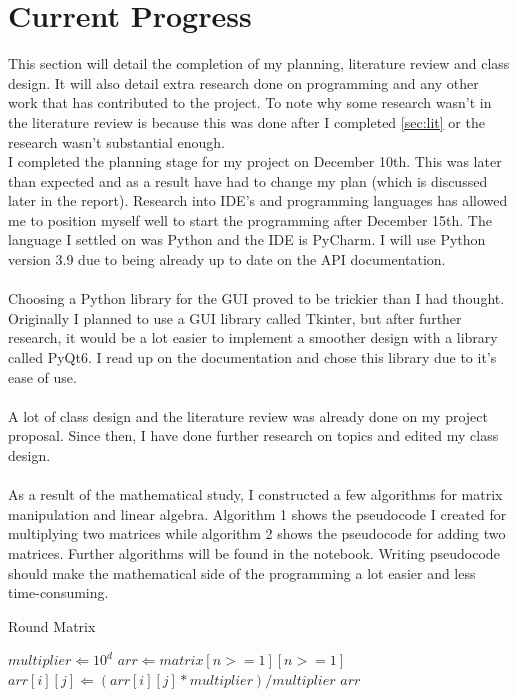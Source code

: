 \documentclass[final]{cmpreport}
\begin{document}
	\section{Current Progress}\label{sec:prog}
	This section will detail the completion of my planning, literature review and class design. It will also detail extra research done on programming and any other work that has contributed to the project. To note why some research wasn't in the literature review is because this was done after I completed \ref{sec:lit} or the research wasn't substantial enough.
	\\I completed the planning stage for my project on December 10th. This was later than expected and as a result have had to change my plan (which is discussed later in the report). Research into IDE's and programming languages has allowed me to position myself well to start the programming after December 15th. The language I settled on was Python and the IDE is PyCharm. I will use Python version 3.9 due to being already up to date on the API documentation.\\
	\\Choosing a Python library for the GUI proved to be trickier than I had thought. Originally I planned to use a GUI library called Tkinter, but after further research, it would be a lot easier to implement a smoother design with a library called PyQt6. I read up on the documentation and chose this library due to it's ease of use. \cite{pyqt}\\
	\\A lot of class design and the literature review was already done on my project proposal. Since then, I have done further research on topics and edited my class design. \\
	\\As a result of the mathematical study, I constructed a few algorithms for matrix manipulation and linear algebra. Algorithm 1 shows the pseudocode I created for multiplying two matrices while algorithm 2 shows the pseudocode for adding two matrices. Further algorithms will be found in the notebook. Writing pseudocode should make the mathematical side of the programming a lot easier and less time-consuming.
	\begin{algorithm}
		\caption{Round Matrix}
		\begin{algorithmic}[3]
			\State $multiplier \Leftarrow 10^d$
			\State $arr \Leftarrow matrix[n>=1][n>=1]$
			\State $arr[i][j] \Leftarrow (arr[i][j]*multiplier)/multiplier$
			\EndFor
			\EndFor
			\Return $arr$
			\EndProcedure			
		\end{algorithmic}
	\end{algorithm}
\end{document}
